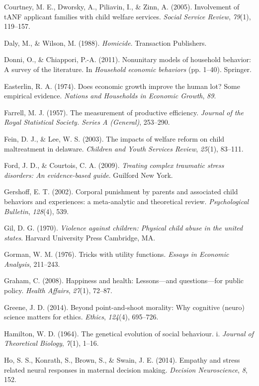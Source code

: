\documentclass[review]{elsarticle}\usepackage[]{graphicx}\usepackage[]{color}
\begin{document}
Courtney, M. E., Dworsky, A., Piliavin, I., \& Zinn, A. (2005).
Involvement of tANF applicant families with child welfare services.
\emph{Social Service Review}, \emph{79}(1), 119--157.

Daly, M., \& Wilson, M. (1988). \emph{Homicide}. Transaction Publishers.

Donni, O., \& Chiappori, P.-A. (2011). Nonunitary models of household
behavior: A survey of the literature. In \emph{Household economic
behaviors} (pp. 1--40). Springer.

Easterlin, R. A. (1974). Does economic growth improve the human lot?
Some empirical evidence. \emph{Nations and Households in Economic
Growth}, \emph{89}.

Farrell, M. J. (1957). The measurement of productive efficiency.
\emph{Journal of the Royal Statistical Society. Series A (General)},
253--290.

Fein, D. J., \& Lee, W. S. (2003). The impacts of welfare reform on
child maltreatment in delaware. \emph{Children and Youth Services
Review}, \emph{25}(1), 83--111.

Ford, J. D., \& Courtois, C. A. (2009). \emph{Treating complex traumatic
stress disorders: An evidence-based guide}. Guilford New York.

Gershoff, E. T. (2002). Corporal punishment by parents and associated
child behaviors and experiences: a meta-analytic and theoretical review.
\emph{Psychological Bulletin}, \emph{128}(4), 539.

Gil, D. G. (1970). \emph{Violence against children: Physical child abuse
in the united states}. Harvard University Press Cambridge, MA.

Gorman, W. M. (1976). Tricks with utility functions. \emph{Essays in
Economic Analysis}, 211--243.

Graham, C. (2008). Happiness and health: Lessons---and questions---for
public policy. \emph{Health Affairs}, \emph{27}(1), 72--87.

Greene, J. D. (2014). Beyond point-and-shoot morality: Why cognitive
(neuro) science matters for ethics. \emph{Ethics}, \emph{124}(4),
695--726.

Hamilton, W. D. (1964). The genetical evolution of social behaviour. i.
\emph{Journal of Theoretical Biology}, \emph{7}(1), 1--16.

Ho, S. S., Konrath, S., Brown, S., \& Swain, J. E. (2014). Empathy and
stress related neural responses in maternal decision making.
\emph{Decision Neuroscience}, \emph{8}, 152.
\end{document}
